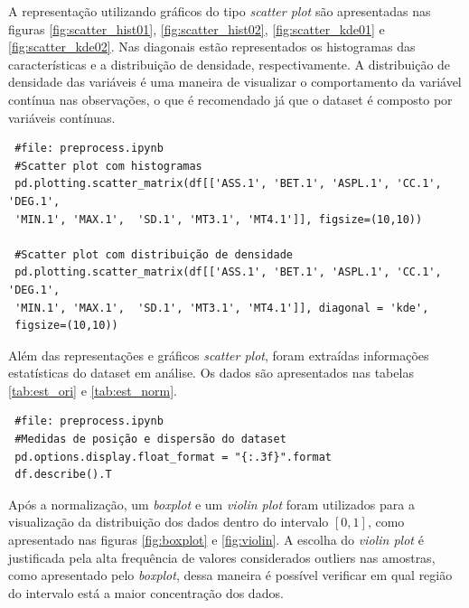 \documentclass[
	article,			%
	11pt,				%
	oneside,			%
	a4paper,			%
	english,			%
	brazil,				%
	sumario=tradicional
	]{abntex2}
\begin{document}
A representação utilizando gráficos do tipo \textit{scatter plot} são apresentadas nas figuras \ref{fig:scatter_hist01}, \ref{fig:scatter_hist02}, \ref{fig:scatter_kde01} e \ref{fig:scatter_kde02}. Nas diagonais estão representados os histogramas das características e a distribuição de densidade, respectivamente. A distribuição de densidade das variáveis é uma maneira de visualizar o comportamento da variável contínua nas observações, o que é recomendado já que o dataset é composto por variáveis contínuas.

\begin{verbatim}
 #file: preprocess.ipynb
 #Scatter plot com histogramas
 pd.plotting.scatter_matrix(df[['ASS.1', 'BET.1', 'ASPL.1', 'CC.1', 'DEG.1',
 'MIN.1', 'MAX.1',  'SD.1', 'MT3.1', 'MT4.1']], figsize=(10,10))
 
 #Scatter plot com distribuição de densidade
 pd.plotting.scatter_matrix(df[['ASS.1', 'BET.1', 'ASPL.1', 'CC.1', 'DEG.1',
 'MIN.1', 'MAX.1',  'SD.1', 'MT3.1', 'MT4.1']], diagonal = 'kde',
 figsize=(10,10))
\end{verbatim}

Além das representações e gráficos \textit{scatter plot}, foram extraídas informações estatísticas do dataset em análise. Os dados são apresentados nas tabelas \ref{tab:est_ori} e \ref{tab:est_norm}.

\begin{verbatim}
 #file: preprocess.ipynb
 #Medidas de posição e dispersão do dataset
 pd.options.display.float_format = "{:.3f}".format
 df.describe().T
\end{verbatim}


Após a normalização, um \textit{boxplot} e um \textit{violin plot} foram utilizados para a visualização da distribuição dos dados dentro do intervalo $[0,1]$, como apresentado nas figuras \ref{fig:boxplot} e \ref{fig:violin}. A escolha do \textit{violin plot} é justificada pela alta frequência de valores considerados outliers nas amostras, como apresentado pelo \textit{boxplot}, dessa maneira é possível verificar em qual região do intervalo está a maior concentração dos dados.
\end{document}
